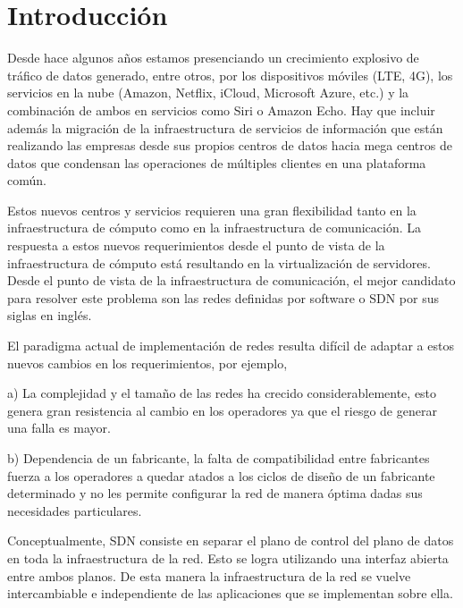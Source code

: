 
\chapter{Introducción} %

\label{Chapter1} %

Desde hace algunos años estamos presenciando un crecimiento explosivo de tráfico de datos generado, entre otros, por los dispositivos móviles (LTE, 4G), los servicios en la nube (Amazon, Netflix, iCloud, Microsoft Azure, etc.) y la combinación de ambos en servicios como Siri o Amazon Echo. Hay que incluir además la migración de la infraestructura de servicios de información que están realizando las empresas desde sus propios centros de datos hacia mega centros de datos que condensan las operaciones de múltiples clientes en una plataforma común.

Estos nuevos centros y servicios requieren una gran flexibilidad tanto en la infraestructura de cómputo como en la infraestructura de comunicación. La respuesta a estos nuevos requerimientos desde el punto de vista de la infraestructura de cómputo está resultando en la virtualización de servidores. Desde el punto de vista de la infraestructura de comunicación, el mejor candidato para resolver este problema son las redes definidas por software o SDN por sus siglas en inglés.

El paradigma actual de implementación de redes resulta difícil de adaptar a estos nuevos cambios en los requerimientos, por ejemplo,

a) La complejidad y el tamaño de las redes ha crecido considerablemente, esto genera gran resistencia al cambio en los operadores ya que el riesgo de generar una falla es mayor.

b) Dependencia de un fabricante, la falta de compatibilidad entre fabricantes fuerza a los operadores a quedar atados a los ciclos de diseño de un fabricante determinado y no les permite configurar la red de manera óptima dadas sus necesidades particulares.

Conceptualmente, SDN consiste en separar el plano de control del plano de datos en toda la infraestructura de la red. Esto se logra utilizando una interfaz abierta entre ambos planos. De esta manera la infraestructura de la red se vuelve intercambiable e independiente de las aplicaciones que se implementan sobre ella.

